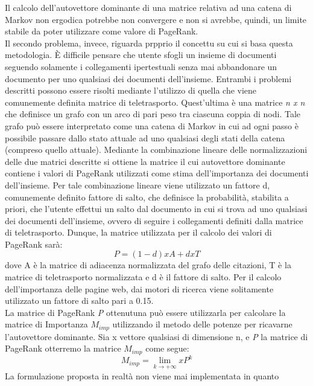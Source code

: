 Il calcolo dell'autovettore dominante di una matrice relativa ad una catena di
Markov non ergodica potrebbe non convergere e non si avrebbe, quindi, un
limite stabile da poter utilizzare come valore di PageRank.\\
Il secondo problema, invece, riguarda prpprio il concettu su cui si basa questa
metodologia. \`E difficile pensare che utente sfogli un insieme di documenti
seguendo solamente i collegamenti ipertestuali senza mai abbandonare un documento
per uno qualsiasi dei documenti dell'insieme.
Entrambi i problemi descritti possono essere risolti mediante l'utilizzo di
quella che viene comunemente definita matrice di teletrasporto. Quest'ultima
\`e una matrice \textit{n x n} che definisce un grafo con un arco di pari peso tra ciascuna
coppia di nodi. Tale grafo pu\`o essere interpretato come una catena di Markov
in cui ad ogni passo \`e possibile passare dallo stato attuale ad uno qualsiasi
degli stati della catena (compreso quello attuale). Mediante la combinazione lineare
delle normalizzazioni delle due matrici descritte si ottiene la matrice il cui
autovettore dominante contiene i valori di PageRank utilizzati come stima
dell'importanza dei documenti dell'insieme. Per tale combinazione lineare viene
utilizzato un fattore d, comunemente definito fattore di salto, che definisce la
probabilit\`a, stabilita a priori, che l'utente effettui un salto dal
documento in cui si trova ad uno qualsiasi dei documenti dell'insieme, ovvero
di seguire i collegamenti definiti dalla matrice di teletrasporto. Dunque, la
matrice utilizzata per il calcolo dei valori di PageRank sar\`a:
\begin{equation}
P = (1 - d) x A + d x T
\end{equation}
dove A \`e la matrice di adiacenza normalizzata del grafo delle citazioni, T \`e
la matrice di teletrasporto normalizzata e d \`e il fattore di salto. Per il calcolo
dell'importanza delle pagine web, dai motori di ricerca viene solitamente
utilizzato un fattore di salto pari a 0.15.\\
La matrice di PageRank \textit{P} ottenutuna pu\`o essere utilizzarla per calcolare
la matrice di Importanza $M_{imp}$ utilizzando il metodo delle potenze per
ricavarne l'autovettore dominante. Sia x vettore qualsiasi di dimensione n,
e \textit{P} la matrice di PageRank otterremo la matrice $M_{imp}$ come segue:
\begin{equation}
M_{imp} = \lim_{k \rightarrow +\infty} x P^{k}
\end{equation}
La formulazione proposta in realt\`a non viene mai implementata in quanto
